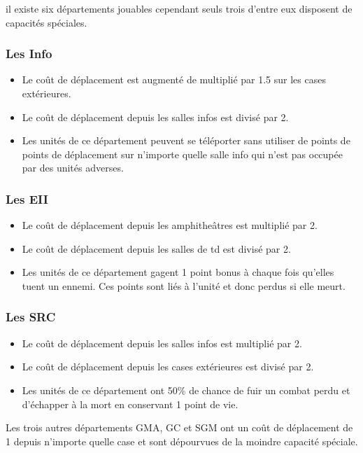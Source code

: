 il existe six départements jouables cependant seuls trois d'entre eux disposent de capacités spéciales. 

\subsubsection{Les Info}
\begin{itemize}
\item Le coût de déplacement est augmenté de multiplié par 1.5 sur les cases extérieures.
\item Le coût de déplacement depuis les salles infos est divisé par 2.
\item Les unités de ce département peuvent se téléporter sans utiliser de points de points de déplacement sur n'importe quelle salle info qui n'est pas occupée par des unités adverses.
\end{itemize}

\subsubsection{Les EII}
\begin{itemize}
\item Le coût de déplacement depuis les amphitheâtres est multiplié par 2.
\item Le coût de déplacement depuis les salles de td est divisé par 2.
\item Les unités de ce département gagent 1 point bonus à chaque fois qu'elles tuent un ennemi. Ces points sont liés à l'unité et donc perdus si elle meurt.
\end{itemize} 

\subsubsection{Les SRC}
\begin{itemize}
\item Le coût de déplacement depuis les salles infos est multiplié par 2.
\item Le coût de déplacement depuis les cases extérieures est divisé par 2.
\item Les unités de ce département ont 50\% de chance de fuir un combat perdu et d'échapper à la mort en conservant 1 point de vie. 
\end{itemize}

Les trois autres départements GMA, GC et SGM ont un coût de déplacement de 1 depuis n'importe quelle case et sont dépourvues de la moindre capacité spéciale.